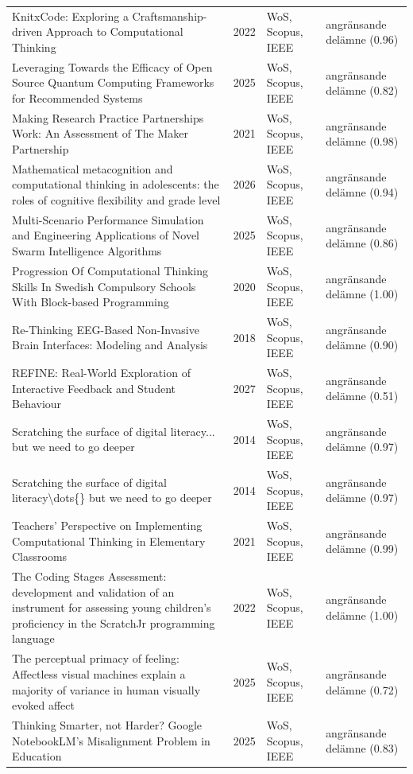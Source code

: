\begin{longtable}{@{}%
  >{\raggedright\arraybackslash}p{}c%
  >{\raggedright\arraybackslash}p{}%
  >{\raggedright\arraybackslash}p{}@{}}
KnitxCode: Exploring a Craftsmanship-driven Approach to Computational Thinking & 2022 & WoS, Scopus, IEEE & angränsande delämne (0.96) \\
Leveraging Towards the Efficacy of Open Source Quantum Computing Frameworks for Recommended Systems & 2025 & WoS, Scopus, IEEE & angränsande delämne (0.82) \\
Making Research Practice Partnerships Work: An Assessment of The Maker Partnership & 2021 & WoS, Scopus, IEEE & angränsande delämne (0.98) \\
Mathematical metacognition and computational thinking in adolescents: the roles of cognitive flexibility and grade level & 2026 & WoS, Scopus, IEEE & angränsande delämne (0.94) \\
Multi-Scenario Performance Simulation and Engineering Applications of Novel Swarm Intelligence Algorithms & 2025 & WoS, Scopus, IEEE & angränsande delämne (0.86) \\
Progression Of Computational Thinking Skills In Swedish Compulsory Schools With Block-based Programming & 2020 & WoS, Scopus, IEEE & angränsande delämne (1.00) \\
Re-Thinking EEG-Based Non-Invasive Brain Interfaces: Modeling and Analysis & 2018 & WoS, Scopus, IEEE & angränsande delämne (0.90) \\
REFINE: Real-World Exploration of Interactive Feedback and Student Behaviour & 2027 & WoS, Scopus, IEEE & angränsande delämne (0.51) \\
Scratching the surface of digital literacy... but we need to go deeper & 2014 & WoS, Scopus, IEEE & angränsande delämne (0.97) \\
Scratching the surface of digital literacy\textbackslash{}dots\{\} but we need to go deeper & 2014 & WoS, Scopus, IEEE & angränsande delämne (0.97) \\
Teachers' Perspective on Implementing Computational Thinking in Elementary Classrooms & 2021 & WoS, Scopus, IEEE & angränsande delämne (0.99) \\
The Coding Stages Assessment: development and validation of an instrument for assessing young children's proficiency in the ScratchJr programming language & 2022 & WoS, Scopus, IEEE & angränsande delämne (1.00) \\
The perceptual primacy of feeling: Affectless visual machines explain a majority of variance in human visually evoked affect & 2025 & WoS, Scopus, IEEE & angränsande delämne (0.72) \\
Thinking Smarter, not Harder? Google NotebookLM's Misalignment Problem in Education & 2025 & WoS, Scopus, IEEE & angränsande delämne (0.83) \\

\end{longtable}
